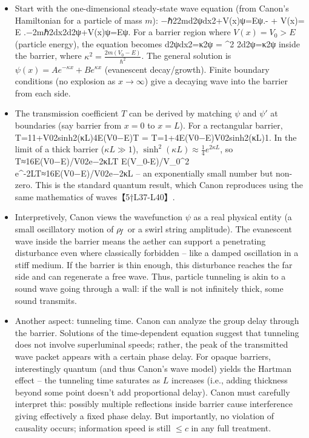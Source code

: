 \documentclass[11pt]{article}
\begin{document}
\begin{itemize}

\item 
Start with the one-dimensional steady-state wave equation (from Canon’s Hamiltonian for a particle of mass $m$): −ℏ22md2ψdx2+V(x)ψ=Eψ.- + V(x)\psi = E\,\psi\,.−2mℏ2dx2d2ψ+V(x)ψ=Eψ. For a barrier region where $V(x)=V_0 > E$ (particle energy), the equation becomes d2ψdx2=κ2ψ = \kappa^2 \psidx2d2ψ=κ2ψ inside the barrier, where $\kappa^2 = \frac{2m(V_0 - E)}{\hbar^2}$. The general solution is $\psi(x) = A e^{-\kappa x} + B e^{\kappa x}$ (evanescent decay/growth). Finite boundary conditions (no explosion as $x\to\infty$) give a decaying wave into the barrier from each side.




\item 
The transmission coefficient $T$ can be derived by matching $\psi$ and $\psi'$ at boundaries (say barrier from $x=0$ to $x=L$). For a rectangular barrier, T=11+V02sinh⁡2(κL)4E(V0−E)T = T=1+4E(V0−E)V02sinh2(κL)1. In the limit of a thick barrier ($\kappa L \gg 1$), $\sinh^2(\kappa L) \approx \frac{1}{4}e^{2\kappa L}$, so T≈16E(V0−E)/V02e−2κLT  E(V_0-E)/V_0^2 \, e^{-2\kappa L}T≈16E(V0−E)/V02e−2κL – an exponentially small number but non-zero. This is the standard quantum result, which Canon reproduces using the same mathematics of waves【5†L37-L40】.




\item 
Interpretively, Canon views the wavefunction $\psi$ as a real physical entity (a small oscillatory motion of $\rho_{\!f}$ or a swirl string amplitude). The evanescent wave inside the barrier means the aether can support a penetrating disturbance even where classically forbidden – like a damped oscillation in a stiff medium. If the barrier is thin enough, this disturbance reaches the far side and can regenerate a free wave. Thus, particle tunneling is akin to a sound wave going through a wall: if the wall is not infinitely thick, some sound transmits.




\item 
Another aspect: tunneling time. Canon can analyze the group delay through the barrier. Solutions of the time-dependent equation suggest that tunneling does not involve superluminal speeds; rather, the peak of the transmitted wave packet appears with a certain phase delay. For opaque barriers, interestingly quantum (and thus Canon’s wave model) yields the Hartman effect – the tunneling time saturates as $L$ increases (i.e., adding thickness beyond some point doesn’t add proportional delay). Canon must carefully interpret this: possibly multiple reflections inside barrier cause interference giving effectively a fixed phase delay. But importantly, no violation of causality occurs; information speed is still $\le c$ in any full treatment.





\end{itemize}
\end{document}
